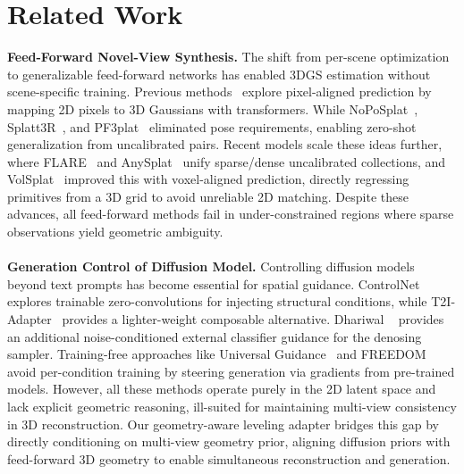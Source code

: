 \section{Related Work}


\label{sec:related}
\noindent \textbf{Feed-Forward Novel-View Synthesis.} The shift from per-scene optimization to generalizable feed-forward networks has enabled 3DGS estimation without scene-specific training. Previous methods~\cite{charatan2024pixelsplat, chen2024mvsplat, xu2024depthsplat} explore pixel-aligned prediction by mapping 2D pixels to 3D Gaussians with transformers. While NoPoSplat~\cite{ye2024nopo}, Splatt3R~\cite{smart2024splatt3r}, and PF3plat~\cite{hong2024pf3plat} eliminated pose requirements, enabling zero-shot generalization from uncalibrated pairs. Recent models scale these ideas further, where FLARE~\cite{zhang2025flare} and AnySplat~\cite{jiang2025anysplat} unify sparse/dense uncalibrated collections, and VolSplat~\cite{wang2025volsplat} improved this with voxel-aligned prediction, directly regressing primitives from a 3D grid to avoid unreliable 2D matching. Despite these advances, all feed-forward methods fail in under-constrained regions where sparse observations yield geometric ambiguity.
\\
\\
\noindent \textbf{Generation Control of Diffusion Model.} Controlling diffusion models beyond text prompts has become essential for spatial guidance. ControlNet~\cite{zhang2023ControlNet} explores trainable zero-convolutions for injecting structural conditions, while T2I-Adapter~\cite{mou2024t2i} provides a lighter-weight composable alternative. Dhariwal \etal~\cite{dhariwal2021diffusion} provides an additional noise-conditioned external classifier guidance for the denosing sampler. Training-free approaches like Universal Guidance~\cite{bansal2023universal} and FREEDOM~\cite{yu2023freedom} avoid per-condition training by steering generation via gradients from pre-trained models. However, all these methods operate purely in the 2D latent space and lack explicit geometric reasoning, ill-suited for maintaining multi-view consistency in 3D reconstruction. Our geometry-aware leveling adapter bridges this gap by directly conditioning on multi-view geometry prior, aligning diffusion priors with feed-forward 3D geometry to enable simultaneous reconstruction and generation.
